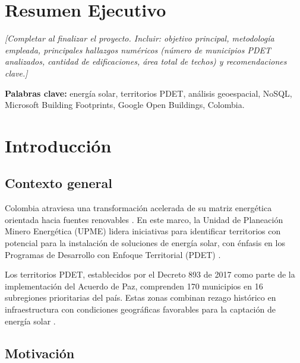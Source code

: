 \documentclass[12pt, a4paper]{report}
\begin{document}
\chapter*{Resumen Ejecutivo}

\textit{[Completar al finalizar el proyecto. Incluir: objetivo principal, metodología
empleada, principales hallazgos numéricos (número de municipios PDET analizados,
cantidad de edificaciones, área total de techos) y recomendaciones clave.]}

\bigskip
\noindent\textbf{Palabras clave:} energía solar, territorios PDET, análisis geoespacial,
NoSQL, Microsoft Building Footprints, Google Open Buildings, Colombia.

\tableofcontents
\listoffigures
\listoftables
\newpage

\chapter{Introducción}
\label{cap:intro}

\section{Contexto general}

Colombia atraviesa una transformación acelerada de su matriz energética orientada
hacia fuentes renovables \parencite{iea2023colombia}. En este marco, la
Unidad de Planeación Minero Energética (UPME) lidera iniciativas para identificar
territorios con potencial para la instalación de soluciones de energía solar,
con énfasis en los Programas de Desarrollo con Enfoque Territorial
(PDET) \parencite{upme2022plan}.

Los territorios PDET, establecidos por el Decreto 893 de 2017 como parte de la
implementación del Acuerdo de Paz, comprenden 170 municipios en 16 subregiones
prioritarias del país. Estas zonas combinan rezago histórico en infraestructura
con condiciones geográficas favorables para la captación de energía solar
\parencite{arteaga2021pdet}.

\section{Motivación}
\end{document}
